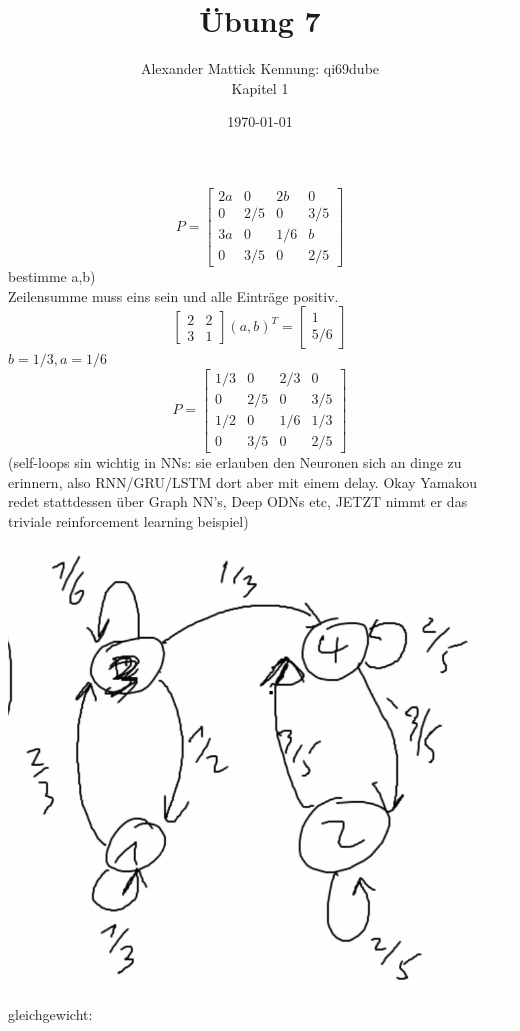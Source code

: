 \documentclass{article}
\author{
Alexander Mattick Kennung: qi69dube\\
Kapitel 1
}
\date{\today}
\title{Übung 7}
\begin{document}
	\[P=\begin{bmatrix}2a&0&2b&0\\0&2/5&0&3/5\\3a&0&1/6&b\\0&3/5&0&2/5 \end{bmatrix}\]
	bestimme a,b)\\
	Zeilensumme muss eins sein und alle Einträge positiv.\\
	\[\begin{bmatrix}2&2\\3&1\end{bmatrix}(a,b)^T = \begin{bmatrix}1\\5/6\end{bmatrix}\]
	$b=1/3, a=1/6$
	\[P=\begin{bmatrix}1/3&0&2/3&0\\0&2/5&0&3/5\\1/2&0&1/6&1/3\\0&3/5&0&2/5 \end{bmatrix}\]
	(self-loops sin wichtig in NNs: sie erlauben den Neuronen sich an dinge zu erinnern, also RNN/GRU/LSTM dort aber mit einem delay. Okay Yamakou redet stattdessen über Graph NN's, Deep ODNs etc, JETZT nimmt er das triviale reinforcement learning beispiel)\\
	\includegraphics{graph.png}\\
	gleichgewicht:\\
\end{document}
